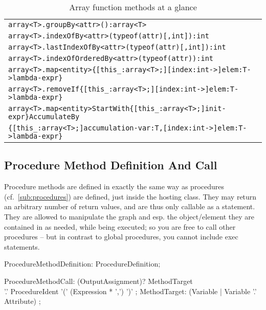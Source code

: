 \begin{table}[htbp]
\begin{tabular}{|l|}
\texttt{array<T>.groupBy<attr>():array<T>}\\
\texttt{array<T>.indexOfBy<attr>(typeof(attr)[,int]):int}\\
\texttt{array<T>.lastIndexOfBy<attr>(typeof(attr)[,int]):int}\\
\texttt{array<T>.indexOfOrderedBy<attr>(typeof(attr)):int}\\
\hline
\verb#array<T>.map<entity>{[this_:array<T>;][index:int->]elem:T->lambda-expr}#\\
\verb#array<T>.removeIf{[this_:array<T>;][index:int->]elem:T->lambda-expr}#\\
\verb#array<T>.map<entity>StartWith{[this_:array<T>;]init-expr}AccumulateBy#\\
\verb#{[this_:array<T>;]accumulation-var:T,[index:int->]elem:T->lambda-expr}#\\
\hline
\end{tabular}
\caption{Array function methods at a glance}
\end{table}

\subsection{Procedure Method Definition And Call}\label{sub:proceduremethods}\label{sub:procmethcall} 

Procedure methods are defined in exactly the same way as procedures (cf.~\ref{sub:procedures}) are defined, just inside the hosting class.
They may return an arbitrary number of return values, and are thus only callable as a statement.
They are allowed to manipulate the graph and esp. the object/element they are contained in as needed, while being executed;
so you are free to call other procedures -- but in contrast to global procedures, you cannot include exec statements.

\begin{rail} 
  ProcedureMethodDefinition: ProcedureDefinition;
\end{rail}

\begin{rail}
  ProcedureMethodCall: (OutputAssignment)? MethodTarget \\
        '.' ProcedureIdent '(' (Expression * ',') ')' ;
  MethodTarget: (Variable | Variable '.' Attribute) ;
\end{rail}


